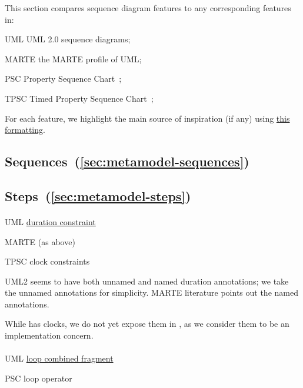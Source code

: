 \newcommand{\insp}[1]{\ul{#1}}

This section compares \langname{} sequence diagram features to any
corresponding features in:


\begin{featset}
\item[UML]
  UML 2.0 sequence diagrams;
\item[MARTE]
  the MARTE profile of UML;
\item[PSC]
  Property Sequence Chart~\cite{psc};
\item[TPSC]
  Timed Property Sequence Chart~\cite{tpsc};
\item
\end{featset}

For each feature, we highlight the main source of inspiration (if any)
using \insp{this formatting}.

\subsection{Sequences~(\ref{sec:metamodel-sequences})}

\subsection{Steps~(\ref{sec:metamodel-steps})}

\paragraph{\mdeadlinestep}
\begin{featset}
\item[UML] \insp{duration constraint}
\item[MARTE] (as above)
\item[TPSC] clock constraints
\end{featset}

UML2 seems to have both unnamed and named duration
  annotations; we take the unnamed annotations for simplicity.  MARTE
  literature points out the named annotations.  

  While \robochart{} has clocks, we do not yet expose them in
  \langname, as we consider them to be an implementation concern.
      
\paragraph{\mloopstep}
\begin{featset}
\item[UML] \insp{loop combined fragment}
\item[PSC] loop operator
\end{featset}

